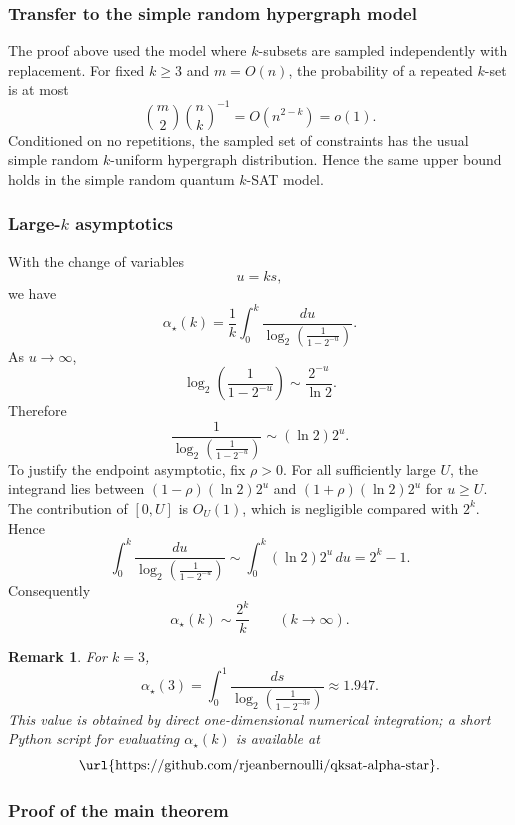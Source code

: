 \documentclass[11pt]{article}
\newtheorem{remark}{Remark}
\begin{document}
	
\subsubsection{Transfer to the simple random hypergraph model}
	
	The proof above used the model where \(k\)-subsets are sampled
	independently with replacement. For fixed \(k\ge3\) and \(m=O(n)\), the
	probability of a repeated \(k\)-set is at most
	\[
	\binom m2 \binom nk^{-1}
	=
	O(n^{2-k})
	=
	o(1).
	\]
	Conditioned on no repetitions, the sampled set of constraints has the
	usual simple random \(k\)-uniform hypergraph distribution. Hence the same
	upper bound holds in the simple random quantum \(k\)-SAT model.
	
\subsubsection{Large-\(k\) asymptotics}
	
	With the change of variables
	\[
	u=ks,
	\]
	we have
	\[
	\alpha_\star(k)
	=
	\frac1k
	\int_0^k
	\frac{du}{
		\log_2\left(\frac1{1-2^{-u}}\right)
	}.
	\]
	As \(u\to\infty\),
	\[
	\log_2\left(\frac1{1-2^{-u}}\right)
	\sim
	\frac{2^{-u}}{\ln2}.
	\]
	Therefore
	\[
	\frac1{
		\log_2\left(\frac1{1-2^{-u}}\right)
	}
	\sim
	(\ln2)2^u.
	\]
	To justify the endpoint asymptotic, fix \(\rho>0\). For all sufficiently
	large \(U\), the integrand lies between
	\((1-\rho)(\ln2)2^u\) and \((1+\rho)(\ln2)2^u\) for \(u\ge U\). The
	contribution of \([0,U]\) is \(O_U(1)\), which is negligible compared with
	\(2^k\). Hence
	\[
	\int_0^k
	\frac{du}{
		\log_2\left(\frac1{1-2^{-u}}\right)
	}
	\sim
	\int_0^k (\ln2)2^u\,du
	=
	2^k-1.
	\]
	Consequently
	\[
	\alpha_\star(k)
	\sim
	\frac{2^k}{k}
	\qquad (k\to\infty).
	\]
	

	\begin{remark}
		For \(k=3\),
		\[
		\alpha_\star(3)
		=
		\int_0^1
		\frac{ds}{
			\log_2\left(\frac1{1-2^{-3s}}\right)
		}
		\approx 1.947.
		\]
		This value is obtained by direct one-dimensional numerical integration; a
		short Python script for evaluating \(\alpha_\star(k)\) is available at
		\[
		\text{\url{https://github.com/rjeanbernoulli/qksat-alpha-star}}.
		\]
	\end{remark}

\subsubsection{Proof of the main theorem}
\end{document}
